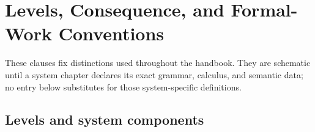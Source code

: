 \chapter{Levels, Consequence, and Formal-Work Conventions}
\label{sec:p01-formal-work}

These clauses fix distinctions used throughout the handbook.  They are
schematic until a system chapter declares its exact grammar, calculus, and
semantic data; no entry below substitutes for those system-specific
definitions.

\section{Levels and system components}
\label{sec:p01-levels-systems}

